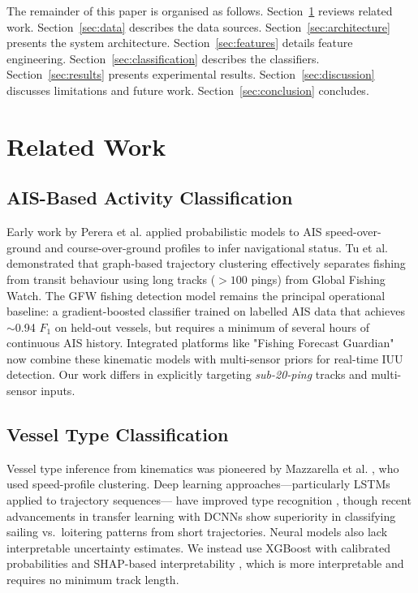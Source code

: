 \documentclass[journal]{IEEEtran}
\begin{document}
The remainder of this paper is organised as follows.
Section~\ref{sec:related} reviews related work.
Section~\ref{sec:data} describes the data sources.
Section~\ref{sec:architecture} presents the system architecture.
Section~\ref{sec:features} details feature engineering.
Section~\ref{sec:classification} describes the classifiers.
Section~\ref{sec:results} presents experimental results.
Section~\ref{sec:discussion} discusses limitations and future work.
Section~\ref{sec:conclusion} concludes.

\section{Related Work}
\label{sec:related}

\subsection{AIS-Based Activity Classification}

Early work by Perera et al. \cite{perera2012maritime} applied probabilistic
models to AIS speed-over-ground and course-over-ground profiles to infer
navigational status.
%
Tu et al. \cite{tu2020exploiting} demonstrated that graph-based trajectory
clustering effectively separates fishing from transit behaviour using long
tracks ($>100$ pings) from Global Fishing Watch.
%
The GFW fishing detection model \cite{kroodsma2018tracking} remains the
principal operational baseline: a gradient-boosted classifier trained on
labelled AIS data that achieves $\sim$0.94 $F_1$ on held-out vessels, but
requires a minimum of several hours of continuous AIS history.
%
Integrated platforms like "Fishing Forecast Guardian" \cite{sharma2025fishing}
now combine these kinematic models with multi-sensor priors for real-time
IUU detection.
%
Our work differs in explicitly targeting \emph{sub-20-ping} tracks and
multi-sensor inputs.

\subsection{Vessel Type Classification}

Vessel type inference from kinematics was pioneered by Mazzarella et al.
\cite{mazzarella2017novel}, who used speed-profile clustering.
%
Deep learning approaches—particularly LSTMs applied to trajectory sequences—
have improved type recognition \cite{nguyen2021geotracknet}, though recent
advancements in transfer learning with DCNNs \cite{kim2024vessel} show
superiority in classifying sailing vs.\ loitering patterns from short
trajectories.
%
Neural models also lack interpretable uncertainty estimates.
%
We instead use XGBoost with calibrated probabilities and SHAP-based
interpretability \cite{ratnasari2025design}, which is more interpretable
and requires no minimum track length.
\end{document}

